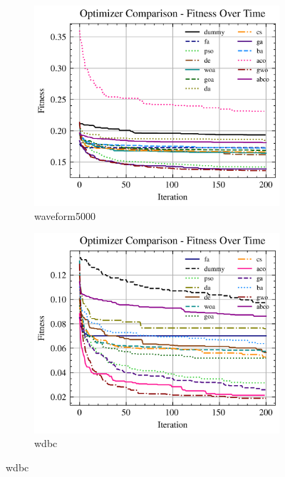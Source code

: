 \begin{figure}[htp]
    \begin{subfigure}[htp]{0.45\textwidth}
        \includegraphics[width=\textwidth]{imagenes/fitness_charts/img/binary/waveform5000/optimizers_fitness_svc.png}
        \caption{waveform5000}
    \end{subfigure}
    \begin{subfigure}[htp]{0.45\textwidth}
        \includegraphics[width=\textwidth]{imagenes/fitness_charts/img/binary/wdbc/optimizers_fitness_svc.png}
        \caption{wdbc}
    \end{subfigure}


\end{figure}
